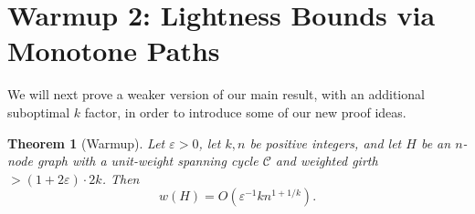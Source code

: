 \documentclass{article}\usepackage[a4paper,margin=20mm]{geometry}
\newtheorem{theorem}{Theorem}\newtheorem{lemma}[theorem]{Lemma}\newtheorem{proposition}[theorem]{Proposition}\newtheorem{corollary}[theorem]{Corollary}\newtheorem{definition}[theorem]{Definition}\newtheorem{claim}[theorem]{Claim}\newtheorem{remark}[theorem]{Remark}\newtheorem{observation}[theorem]{Observation}\newtheorem{conjecture}[theorem]{Conjecture}\newtheorem{example}[theorem]{Example}
\newcommand{\eps}{\varepsilon}
\newcommand{\cee}{\mathcal{C}}
\begin{document}









\section{Warmup 2: Lightness Bounds via Monotone Paths \label{sec:warmup}}

We will next prove a weaker version of our main result, with an additional suboptimal $k$ factor, in order to introduce some of our new proof ideas.
\begin{theorem} [Warmup] \label{thm:warmupmain}
Let $\eps>0$, let $k, n$ be positive integers, and let $H$ be an $n$-node graph with a unit-weight spanning cycle $\cee$ and weighted girth $>(1+2\eps) \cdot 2k$.
Then
$$w(H) = O\left( \eps^{-1} k n^{1+1/k} \right).$$
\end{theorem}
\end{document}
